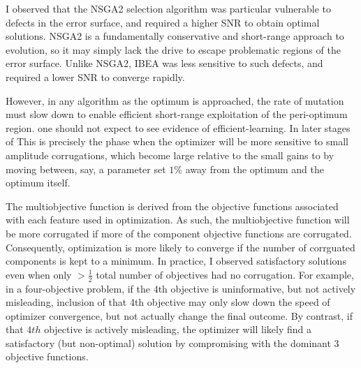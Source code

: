 I observed that the NSGA2 selection algorithm was particular vulnerable to defects in the error surface, and required a higher SNR to obtain optimal solutions.
NSGA2 is a fundamentally conservative and short-range approach to evolution, so it may simply lack the drive to escape problematic regions of the error surface.
Unlike NSGA2, IBEA was less sensitive to such defects, and required a lower SNR to converge rapidly. 

However, in any algorithm as the optimum is approached, the rate of mutation must slow down to enable efficient short-range exploitation of the peri-optimum region.
one should not expect to see evidence of efficient-learning. In later stages of This is precisely the phase when the optimizer will be more sensitive to small amplitude corrugations, which become large relative to the small gains to by moving between, say, a parameter set $1\%$ away from the optimum and the optimum itself.

The multiobjective function is derived from the objective functions associated with each feature used in optimization.
As such, the multiobjective function will be more corrugated if more of the component objective functions are corrugated.
Consequently, optimization is more likely to converge if the number of corrguated components is kept to a minimum.
In practice, I observed satisfactory solutions even when only $>\frac{1}{2}$ total number of objectives had no corrugation.
For example, in a four-objective problem, if the $4$th objective is uninformative, but not actively misleading, inclusion of that 4th objective may only slow down the speed of optimizer convergence, but not actually change the final outcome.
By contrast, if that $4th$ objective is actively misleading, the optimizer will likely find a satisfactory (but non-optimal) solution by compromising with the dominant $3$ objective functions.

%      
%



